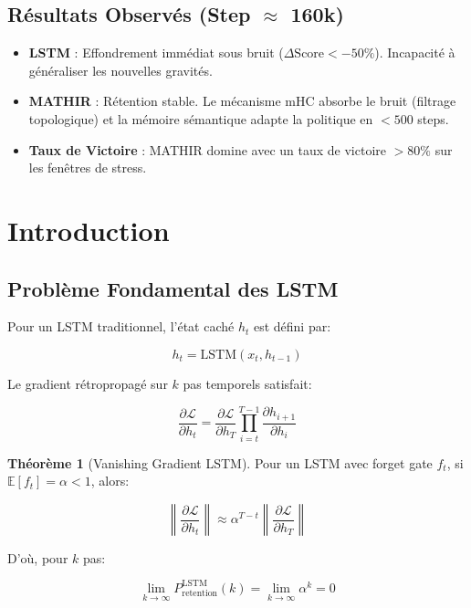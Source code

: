 \documentclass[12pt]{article}
\theoremstyle{definition}
\newtheorem{theorem}{Théorème}
\begin{document}
\subsection{Résultats Observés (Step $\approx$ 160k)}
\begin{itemize}
    \item \textbf{LSTM} : Effondrement immédiat sous bruit ($\Delta \text{Score} < -50\%$). Incapacité à généraliser les nouvelles gravités.
    \item \textbf{MATHIR} : Rétention stable. Le mécanisme mHC absorbe le bruit (filtrage topologique) et la mémoire sémantique adapte la politique en $<500$ steps.
    \item \textbf{Taux de Victoire} : MATHIR domine avec un taux de victoire $>80\%$ sur les fenêtres de stress.
\end{itemize}

\section{Introduction}

\subsection{Problème Fondamental des LSTM}

Pour un LSTM traditionnel, l'état caché $h_t$ est défini par:

\begin{equation}
h_t = \text{LSTM}(x_t, h_{t-1})
\end{equation}

Le gradient rétropropagé sur $k$ pas temporels satisfait:

\begin{equation}
\frac{\partial \mathcal{L}}{\partial h_t} = \frac{\partial \mathcal{L}}{\partial h_T} 
\prod_{i=t}^{T-1} \frac{\partial h_{i+1}}{\partial h_i}
\end{equation}

\begin{theorem}[Vanishing Gradient LSTM]
Pour un LSTM avec forget gate $f_t$, si $\mathbb{E}[f_t] = \alpha < 1$, alors:

\begin{equation}
\left\| \frac{\partial \mathcal{L}}{\partial h_t} \right\| \approx 
\alpha^{T-t} \left\| \frac{\partial \mathcal{L}}{\partial h_T} \right\|
\end{equation}

D'où, pour $k$ pas:

\begin{equation}
\lim_{k \to \infty} P_{\text{retention}}^{\text{LSTM}}(k) = 
\lim_{k \to \infty} \alpha^k = 0
\end{equation}
\end{theorem}
\end{document}
